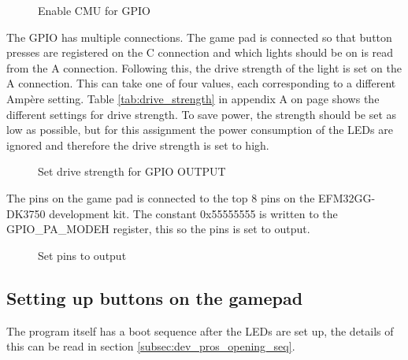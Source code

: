 \begin{figure}[h!]
\caption{Enable CMU for GPIO}
\label{code:enable_cmu_gpio}
\end{figure}

The GPIO has multiple connections. The game pad is connected so that button presses are registered on the C connection and which lights should be on is read from the A connection. Following this, the drive strength of the light is set on the A connection. This can take one of four values, each corresponding to a different Ampère setting. Table \ref{tab:drive_strength} in appendix A on page \pageref{tab:drive_strength} shows the different settings for drive strength. To save power, the strength should be set as low as possible, but for this assignment the power consumption of the LEDs are ignored and therefore the drive strength is set to high.

\begin{figure}[h!]
\caption{Set drive strength for GPIO OUTPUT}
\label{code:set_drive_gpio_o}
\end{figure}

The pins on the game pad is connected to the top 8 pins on the EFM32GG-DK3750 development kit. The constant 0x55555555 is written to the GPIO\_PA\_MODEH register, this so the pins is set to output.

\begin{figure}[h!]
\caption{Set pins to output}
\label{code:set_drive_gpio_o}
\end{figure}

\subsection{Setting up buttons on the gamepad}
\label{subsec:dev_pros_button_setup}
The program itself has a boot sequence after the LEDs are set up, the details of this can be read in section \ref{subsec:dev_pros_opening_seq}.

